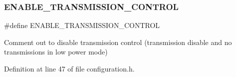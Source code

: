 \subsubsection{\texorpdfstring{E\+N\+A\+B\+L\+E\+\_\+\+T\+R\+A\+N\+S\+M\+I\+S\+S\+I\+O\+N\+\_\+\+C\+O\+N\+T\+R\+OL}{ENABLE\_TRANSMISSION\_CONTROL}}
{\footnotesize\ttfamily \#define E\+N\+A\+B\+L\+E\+\_\+\+T\+R\+A\+N\+S\+M\+I\+S\+S\+I\+O\+N\+\_\+\+C\+O\+N\+T\+R\+OL}

Comment out to disable transmission control (transmission disable and no transmissions in low power mode) 

Definition at line 47 of file configuration.\+h.

